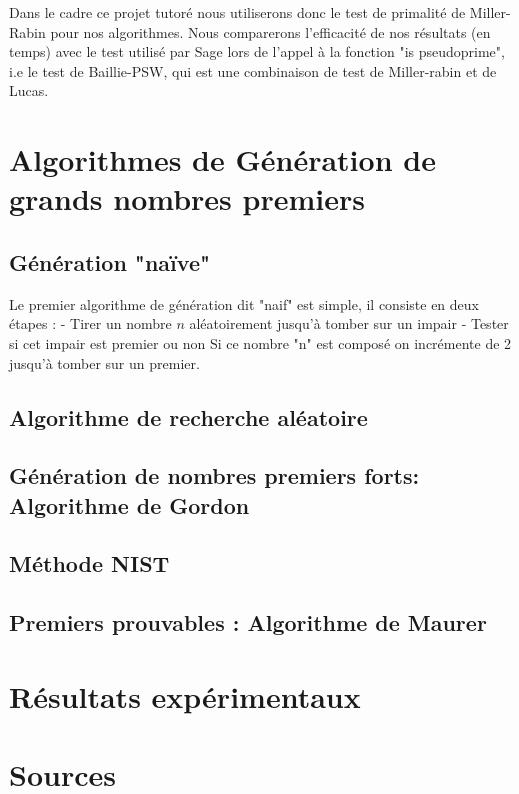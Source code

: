 \documentclass{article}
\begin{document}
Dans le cadre ce projet tutoré nous utiliserons donc le test de primalité de Miller-Rabin pour nos algorithmes. Nous comparerons l'efficacité de nos résultats (en temps) avec le test utilisé par Sage lors de l'appel à la fonction "is pseudoprime", i.e le test de Baillie-PSW, qui est une combinaison de test de Miller-rabin et de Lucas.

\section{Algorithmes de Génération de grands nombres premiers}

\subsection{Génération "naïve"}

Le premier algorithme de génération dit "naif" est simple, il consiste en deux étapes :
    - Tirer un nombre $n$ aléatoirement jusqu'à tomber sur un impair
    - Tester si cet impair est premier ou non
        Si ce nombre "n" est composé on incrémente de 2 jusqu'à tomber sur un premier.
    
\subsection{Algorithme de recherche aléatoire }

\subsection{Génération de nombres premiers forts: Algorithme de Gordon}

\subsection{Méthode NIST}

\subsection{Premiers prouvables : Algorithme de Maurer}

\section{Résultats expérimentaux}

\section*{Sources}




 
  
\end{document}
